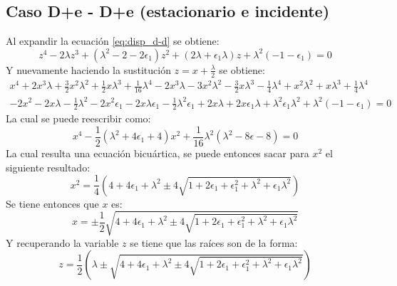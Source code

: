 \documentclass[12pt]{article}
\begin{document}
\subsection*{Caso D+e - D+e (estacionario e incidente)}
Al expandir la ecuación \ref{eq:disp_d-d} se obtiene:
\begin{equation}
z^4 -2\lambda z^3+ (\lambda^2 -2 - 2\epsilon_1)z^2 + (2\lambda+\epsilon_1 \lambda)z+ \lambda^2 (-1 -\epsilon_1)=0
\end{equation}
Y nuevamente haciendo la sustitución $z=x + \frac{ \lambda}{2}$ se obtiene:
\begin{multline}
x^4+2x^3\lambda + \frac{3}{2}x^2 \lambda^2 + \frac{1}{2}x\lambda^3 +\frac{1}{16}\lambda^4 -2x^3 \lambda -3x^2 \lambda^2 - \frac{3}{2}x\lambda^3 - \frac{1}{4}\lambda^4 +x^2\lambda^2 + x\lambda^3 +\frac{1}{4}\lambda^4\\ 
  -2x^2-2x\lambda -\frac{1}{2}\lambda^2 - 2x^2 \epsilon_1-2x\lambda\epsilon_1-\frac{1}{2}\lambda^2\epsilon_1+2x\lambda+2x\epsilon_1\lambda + \lambda^2 \epsilon_1\lambda^2+\lambda^2(-1-\epsilon_1)=0
\end{multline}
La cual se puede reescribir como:
\begin{equation}
x^4 -\frac{1}{2}(\lambda^2 +4\epsilon_1 + 4)x^2 + \frac{1}{16}\lambda^2(\lambda^2 - 8\epsilon -8)=0
\end{equation}
La cual resulta una ecuación bicuártica, se puede entonces sacar para $x^2$ el siguiente resultado:
\begin{equation}
x^2 = \frac{1}{4}\left(4+4\epsilon_1+\lambda^2 \pm 4\sqrt{1+2\epsilon_1+\epsilon_1^2 + \lambda^2+\epsilon_1\lambda^2}\right)
\end{equation}
Se tiene entonces que $x$ es:
\begin{equation}
x=\pm \frac{1}{2} \sqrt{4+4\epsilon_1+\lambda^2 \pm 4\sqrt{1+2\epsilon_1+\epsilon_1^2 + \lambda^2+\epsilon_1\lambda^2}}
\end{equation}
Y recuperando la variable $z$ se tiene que las raíces son de la forma:
\begin{equation}
z = \frac{1}{2}\left(\lambda \pm \sqrt{4+4\epsilon_1+\lambda^2 \pm 4\sqrt{1+2\epsilon_1+\epsilon_1^2 + \lambda^2+\epsilon_1\lambda^2}}\right)
\end{equation}
\end{document}

